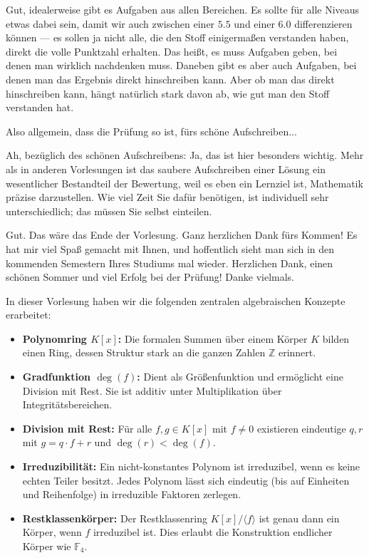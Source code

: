 \begin{spoken-clean}[01:27:49 - 01:28:29]
Gut, idealerweise gibt es Aufgaben aus allen Bereichen. Es sollte für alle Niveaus etwas dabei sein, damit wir auch zwischen einer $5.5$ und einer $6.0$ differenzieren können --- es sollen ja nicht alle, die den Stoff einigermaßen verstanden haben, direkt die volle Punktzahl erhalten. Das heißt, es muss Aufgaben geben, bei denen man wirklich nachdenken muss. Daneben gibt es aber auch Aufgaben, bei denen man das Ergebnis direkt hinschreiben kann. Aber ob man das direkt hinschreiben kann, hängt natürlich stark davon ab, wie gut man den Stoff verstanden hat.
\end{spoken-clean}

\begin{student-interaction}[Studentenfrage]
Also allgemein, dass die Prüfung so ist, fürs schöne Aufschreiben...
\end{student-interaction}

\begin{spoken-clean}[01:28:29 - 01:29:21]
Ah, bezüglich des schönen Aufschreibens: Ja, das ist hier besonders wichtig. Mehr als in anderen Vorlesungen ist das saubere Aufschreiben einer Lösung ein wesentlicher Bestandteil der Bewertung, weil es eben ein Lernziel ist, Mathematik präzise darzustellen. Wie viel Zeit Sie dafür benötigen, ist individuell sehr unterschiedlich; das müssen Sie selbst einteilen.

Gut. Das wäre das Ende der Vorlesung. Ganz herzlichen Dank fürs Kommen! Es hat mir viel Spaß gemacht mit Ihnen, und hoffentlich sieht man sich in den kommenden Semestern Ihres Studiums mal wieder. Herzlichen Dank, einen schönen Sommer und viel Erfolg bei der Prüfung! Danke vielmals.
\end{spoken-clean}

\begin{nice-box}
In dieser Vorlesung haben wir die folgenden zentralen algebraischen Konzepte erarbeitet:
\begin{itemize}
    \item \textbf{Polynomring $K[x]$:} Die formalen Summen über einem Körper $K$ bilden einen Ring, dessen Struktur stark an die ganzen Zahlen $\mathbb{Z}$ erinnert.
    \item \textbf{Gradfunktion $\deg(f)$:} Dient als Größenfunktion und ermöglicht eine Division mit Rest. Sie ist additiv unter Multiplikation über Integritätsbereichen.
    \item \textbf{Division mit Rest:} Für alle $f, g \in K[x]$ mit $f \neq 0$ existieren eindeutige $q, r$ mit $g = q \cdot f + r$ und $\deg(r) < \deg(f)$.
    \item \textbf{Irreduzibilität:} Ein nicht-konstantes Polynom ist irreduzibel, wenn es keine echten Teiler besitzt. Jedes Polynom lässt sich eindeutig (bis auf Einheiten und Reihenfolge) in irreduzible Faktoren zerlegen.
    \item \textbf{Restklassenkörper:} Der Restklassenring $K[x]/\langle f \rangle$ ist genau dann ein Körper, wenn $f$ irreduzibel ist. Dies erlaubt die Konstruktion endlicher Körper wie $\mathbb{F}_4$.
\end{itemize}
\end{nice-box}